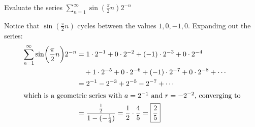 \documentclass[12pt,answers]{exam}
\begin{document}
\begin{questions}

\question[8] Evaluate the series $\displaystyle \sum_{n=1}^\infty \sin(\frac\pi2 n) 2^{-n}$
\begin{solution}
    Notice that $\sin(\frac\pi2 n)$ cycles between the values $1, 0, -1, 0$. Expanding out the series:
    \begin{align*}
\sum_{n=1}^\infty \sin(\frac\pi2 n) 2^{-n}
        &= 1 \cdot 2^{-1} + 0 \cdot 2^{-2} + (-1) \cdot 2^{-3} + 0 \cdot 2^{-4} \\ 
        &\quad + 1 \cdot 2^{-5} + 0 \cdot 2^{-6} + (-1) \cdot 2^{-7} + 0 \cdot 2^{-8} + \cdots \\
        &= 2^{-1} - 2^{-3} + 2^{-5} - 2^{-7} + \cdots \\
        \intertext{which is a geometric series with $a = 2^{-1}$ and $r = -2^{-2}$, converging to}
        &= \frac{\frac12}{1 - (-\frac14)}
        = \frac 12 \cdot \frac 45 
        = \boxed{\frac 25}
    \end{align*}
\end{solution}


\end{questions}
\end{document}
